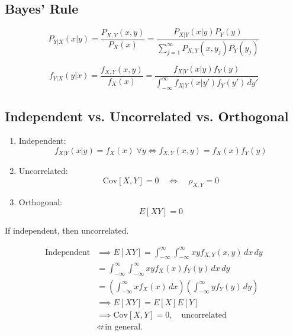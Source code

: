 \subsection{Bayes' Rule}
\begin{definition}
    \begin{equation}
    P_{Y|X}(x|y) = \frac{P_{X,Y}(x, y)}{P_X(x)} = \frac{P_{X|Y}(x|y) P_Y(y)}{\sum_{j=1}^\infty P_{X,Y}(x, y_j) P_Y (y_j)}
    \end{equation}
    
    \begin{equation}
    f_{Y|X}(y|x) = \frac{f_{X,Y}(x, y)}{f_X(x)} = \frac{f_{X|Y}(x|y) f_Y(y)}{\int_{-\infty}^\infty f_{X|Y}(x|y') f_Y(y') \, dy'}
    \end{equation}  
\end{definition}

\subsection{Independent vs. Uncorrelated vs. Orthogonal}
\begin{definition} 
    \begin{enumerate}
        \item Independent:
        \begin{equation}
        f_{X|Y}(x|y) = f_X(x) \; \forall y
        \Leftrightarrow 
        f_{X,Y}(x, y) = f_X(x) f_Y(y) 
        \end{equation}
        \item Uncorrelated:
        \begin{equation}
        \text{Cov}[X, Y] = 0 \quad \Leftrightarrow \quad \rho_{X,Y} = 0
        \end{equation}
        \item Orthogonal:
        \begin{equation}
        E[XY] = 0
        \end{equation}
    \end{enumerate}
\end{definition}

\begin{theorem}
    If independent, then uncorrelated.
\end{theorem}

\begin{derivation}
    \begin{align*}
    \text{Independent} & \implies E[XY] = \int_{-\infty}^{\infty} \int_{-\infty}^{\infty} x y f_{X,Y}(x, y) \, dx \, dy \\
    &= \int_{-\infty}^{\infty} \int_{-\infty}^{\infty} x y f_X(x) f_Y(y) \, dx \, dy \\
    &= \left( \int_{-\infty}^{\infty} x f_X(x) \, dx \right) \left( \int_{-\infty}^{\infty} y f_Y(y) \, dy \right) \\
    &\implies E[XY] = E[X] E[Y] \\
    &\implies \text{Cov}[X, Y] = 0, \quad \text{uncorrelated} \\
    &\not\Leftarrow \text{in general.}
    \end{align*}
\end{derivation}

